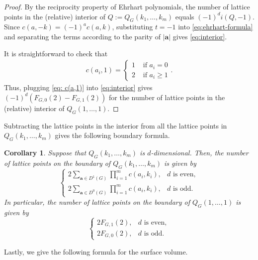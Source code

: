 \documentclass[11pt,a4paper]{article}
\newcommand{\vct}[1]{\boldsymbol{#1}}
\newcommand{\1}{\mathbf{1}}
\theoremstyle{plain}
\newtheorem{corollary}[theorem]{Corollary}
\theoremstyle{definition}
\begin{document}
\begin{proof}
By the reciprocity property of Ehrhart polynomials, the number of lattice points in the (relative) interior of $Q:=Q_G(k_1, \dots, k_m)$ equals $(-1)^d i(Q,-1)$. Since $c(a,-k) = (-1)^ac(a,k)$, substituting $t=-1$ into \eqref{eq:ehrhart-formula} and separating the terms according to the parity of $|\vct{a}|$ gives \eqref{eq:interior}.

It is straightforward to check that
\begin{align}\label{eq: c(a,1)}
c(a_i,1)=
    \begin{cases}
       1 &\text{ if } a_i = 0\\
       2 &\text{ if } a_i \geq 1
    \end{cases}.
\end{align}
Thus, plugging \eqref{eq: c(a,1)} into \eqref{eq:interior} gives $(-1)^d(F_{G,0}(2)-F_{G,1}(2))$ for the number of lattice points in the (relative) interior of $Q_G(1,\dots, 1)$.
\end{proof}

Subtracting the lattice points in the interior from all the lattice points in $Q_G(k_1, \dots, k_m)$ gives the following boundary formula.

\begin{corollary}
Suppose that $Q_G(k_1,\ldots,k_m)$ is $d$-dimensional. Then, the number of lattice points on the boundary of $Q_G(k_1,\ldots,k_m)$ is given by
\begin{equation}
\begin{cases}
2\displaystyle\sum_{\vct{a}\in D^1(G)}\prod_{i=1}^m c(a_i,k_i),&d\text{ is even},\\[8pt]
2\displaystyle\sum_{\vct{a}\in D^0(G)}\prod_{i=1}^m c(a_i,k_i),&d\text{ is odd}.
\end{cases}
\label{eq:boundary}
\end{equation}
In particular, the number of lattice points on the boundary of $Q_G(1,\dots, 1)$ is given by
\begin{equation}
\begin{cases}
2F_{G,1}(2),&d\text{ is even},\\
2F_{G,0}(2),&d\text{ is odd}.
\end{cases}
\label{eq:boundary-111}
\end{equation}
\end{corollary}

Lastly, we give the following formula for the surface volume.
\end{document}
